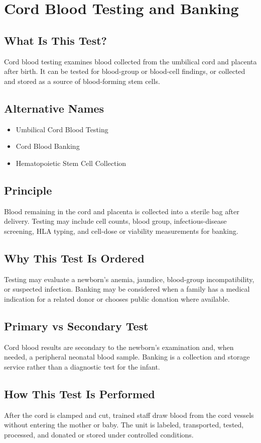 \chapter{Cord Blood Testing and Banking}
\section*{What Is This Test?}
Cord blood testing examines blood collected from the umbilical cord and placenta after birth. It can be tested for blood-group or blood-cell findings, or collected and stored as a source of blood-forming stem cells.
\section*{Alternative Names}
\begin{itemize}\item Umbilical Cord Blood Testing\item Cord Blood Banking\item Hematopoietic Stem Cell Collection\end{itemize}
\section*{Principle}
Blood remaining in the cord and placenta is collected into a sterile bag after delivery. Testing may include cell counts, blood group, infectious-disease screening, HLA typing, and cell-dose or viability measurements for banking.
\section*{Why This Test Is Ordered}
Testing may evaluate a newborn's anemia, jaundice, blood-group incompatibility, or suspected infection. Banking may be considered when a family has a medical indication for a related donor or chooses public donation where available.
\section*{Primary vs Secondary Test}
Cord blood results are secondary to the newborn's examination and, when needed, a peripheral neonatal blood sample. Banking is a collection and storage service rather than a diagnostic test for the infant.
\section*{How This Test Is Performed}
After the cord is clamped and cut, trained staff draw blood from the cord vessels without entering the mother or baby. The unit is labeled, transported, tested, processed, and donated or stored under controlled conditions.
